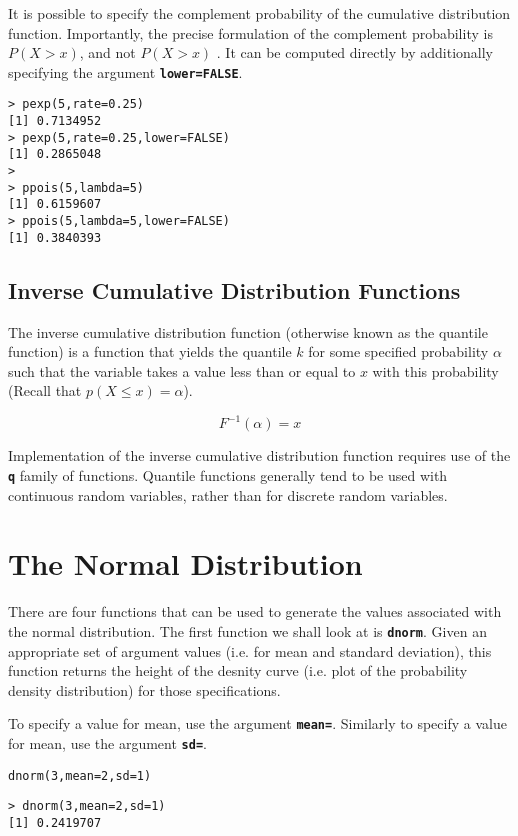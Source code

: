 \documentclass[a4paper,12pt]{article}
\begin{document}
It is possible to specify the complement probability of the cumulative distribution function. Importantly, the precise formulation of the complement probability is $P(X > x)$, and not $P(X > x)$ . It can be computed directly by additionally specifying the argument \texttt{\textbf{lower=FALSE}}.

\begin{framed}
\begin{verbatim}
> pexp(5,rate=0.25)
[1] 0.7134952
> pexp(5,rate=0.25,lower=FALSE)
[1] 0.2865048
> 
> ppois(5,lambda=5)
[1] 0.6159607
> ppois(5,lambda=5,lower=FALSE)
[1] 0.3840393
\end{verbatim}
\end{framed}
 
\subsection{Inverse Cumulative Distribution Functions}

The inverse cumulative distribution function (otherwise known as the quantile function) is a function that yields the quantile $k$ for some specified probability $\alpha$ such that the variable takes a value less than or equal to $x$ with this probability (Recall that $p(X \leq x) = \alpha $).

\[F^{-1}(\alpha) = x  \]

Implementation of the inverse cumulative distribution function requires use of the \texttt{\textbf{q}} family of functions. Quantile functions generally tend to be used with continuous random variables, rather than for discrete random variables.
\newpage
\section{The Normal Distribution}

There are four functions that can be used to generate the values associated with the normal distribution.  
The first function we shall look at is \textbf{\texttt{dnorm}}. Given an appropriate set of argument values (i.e. for mean and standard deviation), this function returns the height of the desnity curve (i.e. plot of the probability density distribution) for those specifications. 

To specify a value for mean, use the argument \textbf{\texttt{mean=}}. Similarly to specify a value for mean, use the argument \textbf{\texttt{sd=}}.

\begin{framed}
\begin{verbatim}
dnorm(3,mean=2,sd=1)
\end{verbatim}
\end{framed}
\begin{verbatim}
> dnorm(3,mean=2,sd=1)
[1] 0.2419707
\end{verbatim}
\end{document}
